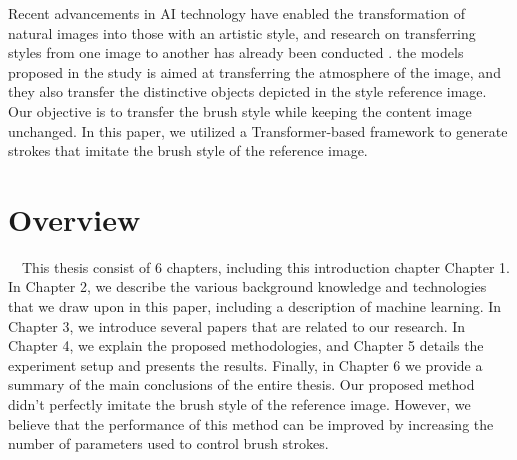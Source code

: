 Recent advancements in AI technology have enabled the transformation of natural 
images into those with an artistic style, and research on transferring styles 
from one image to another has already been conducted \cite{Gatys_2016_CVPR}.  
the models proposed in the study is aimed at transferring the atmosphere of the 
image, and they also transfer the distinctive objects depicted in the style 
reference image. 
Our objective is to transfer the brush style while keeping the content image 
unchanged. In this paper, we utilized a Transformer-based framework to generate 
strokes that imitate the brush style of the reference image. 


\section{Overview}
　This thesis consist of 6 chapters, including this introduction chapter Chapter 1.
In Chapter 2, we describe the various background knowledge and technologies that 
we draw upon in this paper, including a description of machine learning.
In Chapter 3, we introduce several papers that are related to our research.
In Chapter 4, we explain the proposed methodologies, and Chapter 5 details 
the experiment setup and presents the results.
Finally, in Chapter 6 we provide a summary of the main conclusions of 
the entire thesis. Our proposed method didn't perfectly imitate the brush style 
of the reference image. However, we believe that the performance of this method 
can be improved by increasing the number of parameters used to control brush 
strokes.


